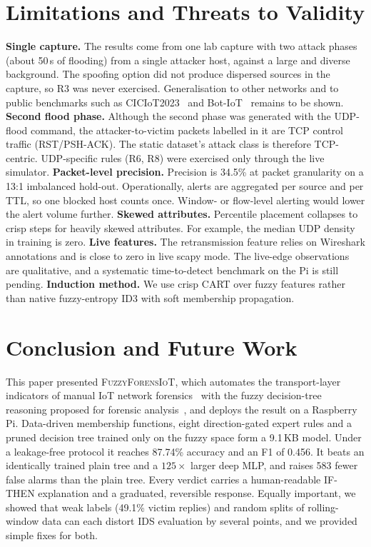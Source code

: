 \documentclass[conference]{IEEEtran}
\newcommand{\fname}{\textsc{FuzzyForensIoT}}
\begin{document}
\section{Limitations and Threats to Validity}
\label{sec:limits}
\textbf{Single capture.} The results come from one lab capture with two attack phases (about 50\,s of flooding) from a single attacker host, against a large and diverse background. The spoofing option did not produce dispersed sources in the capture, so R3 was never exercised. Generalisation to other networks and to public benchmarks such as CICIoT2023~\cite{neto2023} and Bot-IoT~\cite{koroniotis2019} remains to be shown.
\textbf{Second flood phase.} Although the second phase was generated with the UDP-flood command, the attacker-to-victim packets labelled in it are TCP control traffic (RST/PSH-ACK). The static dataset's attack class is therefore TCP-centric. UDP-specific rules (R6, R8) were exercised only through the live simulator.
\textbf{Packet-level precision.} Precision is 34.5\% at packet granularity on a 13:1 imbalanced hold-out. Operationally, alerts are aggregated per source and per TTL, so one blocked host counts once. Window- or flow-level alerting would lower the alert volume further.
\textbf{Skewed attributes.} Percentile placement collapses to crisp steps for heavily skewed attributes. For example, the median UDP density in training is zero.
\textbf{Live features.} The retransmission feature relies on Wireshark annotations and is close to zero in live scapy mode. The live-edge observations are qualitative, and a systematic time-to-detect benchmark on the Pi is still pending.
\textbf{Induction method.} We use crisp CART over fuzzy features rather than native fuzzy-entropy ID3 with soft membership propagation.

\section{Conclusion and Future Work}
\label{sec:conclusion}
This paper presented \fname{}, which automates the transport-layer indicators of manual IoT network forensics~\cite{naing2023,khaing2020} with the fuzzy decision-tree reasoning proposed for forensic analysis~\cite{ye2022}, and deploys the result on a Raspberry Pi. Data-driven membership functions, eight direction-gated expert rules and a pruned decision tree trained only on the fuzzy space form a 9.1\,KB model. Under a leakage-free protocol it reaches 87.74\% accuracy and an F1 of 0.456. It beats an identically trained plain tree and a $125\times$ larger deep MLP, and raises 583 fewer false alarms than the plain tree. Every verdict carries a human-readable IF-THEN explanation and a graduated, reversible response. Equally important, we showed that weak labels (49.1\% victim replies) and random splits of rolling-window data can each distort IDS evaluation by several points, and we provided simple fixes for both.
\end{document}
